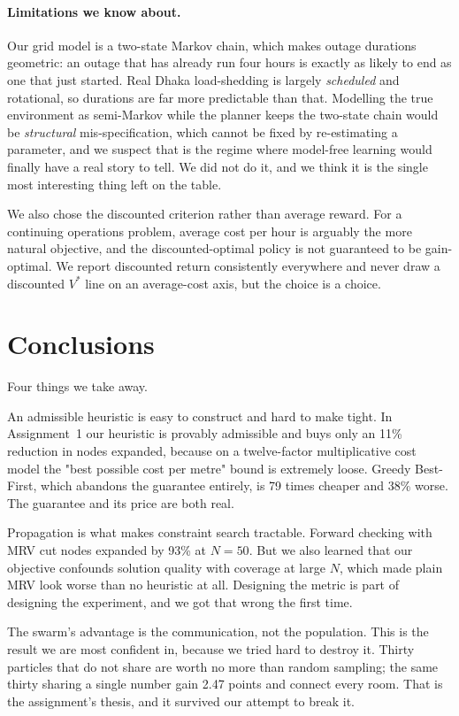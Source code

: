 \documentclass{ai-lab-report}
\begin{document}
\paragraph{Limitations we know about.}
Our grid model is a two-state Markov chain, which makes outage durations geometric: an outage
that has already run four hours is exactly as likely to end as one that just started. Real
Dhaka load-shedding is largely \emph{scheduled} and rotational, so durations are far more
predictable than that. Modelling the true environment as semi-Markov while the planner keeps
the two-state chain would be \emph{structural} mis-specification, which cannot be fixed by
re-estimating a parameter, and we suspect that is the regime where model-free learning would
finally have a real story to tell. We did not do it, and we think it is the single most
interesting thing left on the table.

We also chose the discounted criterion rather than average reward. For a continuing operations
problem, average cost per hour is arguably the more natural objective, and the discounted-optimal
policy is not guaranteed to be gain-optimal. We report discounted return consistently everywhere
and never draw a discounted $V^*$ line on an average-cost axis, but the choice is a choice.

\section{Conclusions}
\label{sec:conc}
Four things we take away.

An admissible heuristic is easy to construct and hard to make tight. In Assignment~1 our heuristic is
provably admissible and buys only an 11\% reduction in nodes expanded, because on a
twelve-factor multiplicative cost model the "best possible cost per metre" bound is extremely
loose. Greedy Best-First, which abandons the guarantee entirely, is 79 times cheaper and 38\%
worse. The guarantee and its price are both real.

Propagation is what makes constraint search tractable. Forward checking with MRV cut nodes
expanded by 93\% at $N=50$. But we also learned
that our objective confounds solution quality with coverage at large $N$, which made plain MRV
look worse than no heuristic at all. Designing the metric is part of designing the experiment,
and we got that wrong the first time.

The swarm's advantage is the communication, not the population. This is the result we are most
confident in, because we tried hard to destroy it. Thirty particles that do not share are worth
no more than random sampling; the same thirty sharing a single number gain 2.47 points and
connect every room. That is the assignment's thesis, and it survived our attempt to break it.
\end{document}
